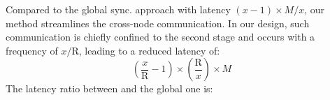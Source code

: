 










Compared to the global sync. approach with latency \( (x-1) \times M/x \), our method streamlines the cross-node communication. In our design, such communication is chiefly confined to the second stage and occurs with a frequency of \( x/\text{R} \), leading to a reduced latency of:
\vspace{-5pt}
\[ \left( \frac{x}{\text{R}} - 1 \right)\times \left( \frac{\text{R}}{x} \right)  \times M  \]
The latency ratio between \SysName and the global one is:

